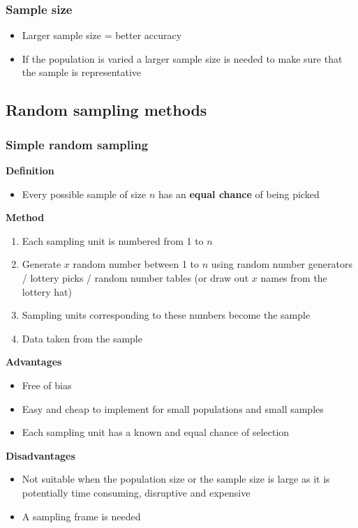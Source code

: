 \documentclass[A4paper, 11pt]{article}
\begin{document}
	\subsubsection{Sample size}
	\begin{itemize}
		\item Larger sample size = better accuracy
		\item If the population is varied a larger sample size is needed to make sure that the sample is representative
	\end{itemize}
	
	
	\subsection{Random sampling methods}
	\subsubsection{Simple random sampling}
	\textbf{Definition}
	\begin{itemize}
		\item Every possible sample of size $n$ has an \textbf{equal chance} of being picked
	\end{itemize}
	\textbf{Method}
	\begin{enumerate}
		\item Each sampling unit is numbered from 1 to $n$
		\item Generate $x$ random number between 1 to $n$ using random number generators / lottery picks / random number tables (or draw out $x$ names from the lottery hat)
		\item Sampling units corresponding to these numbers become the sample
		\item Data taken from the sample
	\end{enumerate}
	\textbf{Advantages}
	\begin{itemize}
		\item Free of bias
		\item Easy and cheap to implement for small populations and small samples
		\item Each sampling unit has a known and equal chance of selection
	\end{itemize}
	\textbf{Disadvantages}
	\begin{itemize}
		\item Not suitable when the population size or the sample size is large as it is potentially time consuming, disruptive and expensive
		\item A sampling frame is needed
	\end{itemize}
\end{document}

